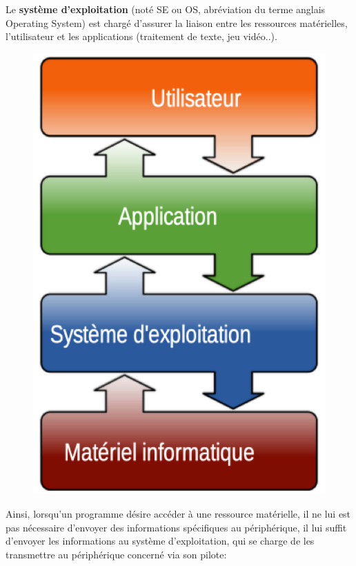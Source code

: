 \documentclass[11pt, a4paper]{book}
\begin{document}
\begin{defi}
	Le {\bf système d’exploitation} (noté SE ou OS, abréviation du terme anglais Operating System) est chargé d’assurer la liaison entre les ressources matérielles, l'utilisateur et les applications (traitement de texte, jeu vidéo..). 
\end{defi}	

\begin{figure}[h]
	\centering
	\includegraphics[scale=.3]{images/systemeexploitation}
\end{figure}
	
	Ainsi, lorsqu’un programme désire accéder à une ressource matérielle, il ne lui est pas nécessaire d’envoyer des informations spécifiques au périphérique, il lui suffit d’envoyer les informations au système d’exploitation, qui se charge de les transmettre au périphérique concerné via son pilote:
	
\end{document}

